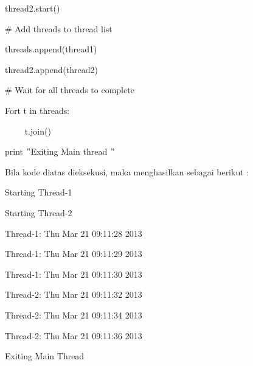 \documentclass{wileySix}
\begin{document}
{\fontsize{10pt}{10pt}\selectfont thread2.start()} \par
\vspace{10pt}
\noindent 
{\fontsize{10pt}{10pt}\selectfont  $  \#  $ Add threads to thread list} \par
\noindent 
{\fontsize{10pt}{10pt}\selectfont threads.append(thread1)} \par
\noindent 
{\fontsize{10pt}{10pt}\selectfont thread2.append(thread2)} \par
\vspace{10pt}
\noindent 
{\fontsize{10pt}{10pt}\selectfont  $  \#  $ Wait for all threads to complete} \par
\noindent 
{\fontsize{10pt}{10pt}\selectfont Fort t in threads:} \par
\noindent 
{\fontsize{10pt}{10pt}\selectfont ~~~~ t.join()} \par
\noindent 
{\fontsize{10pt}{10pt}\selectfont print  $ " $Exiting Main thread $ " $} \par
\vspace{10pt}
\noindent 
Bila kode diatas dieksekusi, maka menghasilkan sebagai berikut : \par
\vspace{10pt}
\noindent 
{\fontsize{10pt}{10pt}\selectfont Starting Thread-1} \par
\noindent 
{\fontsize{10pt}{10pt}\selectfont Starting Thread-2} \par
\noindent 
{\fontsize{10pt}{10pt}\selectfont Thread-1: Thu Mar 21 09:11:28 2013} \par
\noindent 
{\fontsize{10pt}{10pt}\selectfont Thread-1: Thu Mar 21 09:11:29 2013} \par
\noindent 
{\fontsize{10pt}{10pt}\selectfont Thread-1: Thu Mar 21 09:11:30 2013} \par
\noindent 
{\fontsize{10pt}{10pt}\selectfont Thread-2: Thu Mar 21 09:11:32 2013} \par
\noindent 
{\fontsize{10pt}{10pt}\selectfont Thread-2: Thu Mar 21 09:11:34 2013} \par
\noindent 
{\fontsize{10pt}{10pt}\selectfont Thread-2: Thu Mar 21 09:11:36 2013} \par
\noindent 
{\fontsize{10pt}{10pt}\selectfont Exiting Main Thread} \par
\vspace{12pt}
\end{document}
